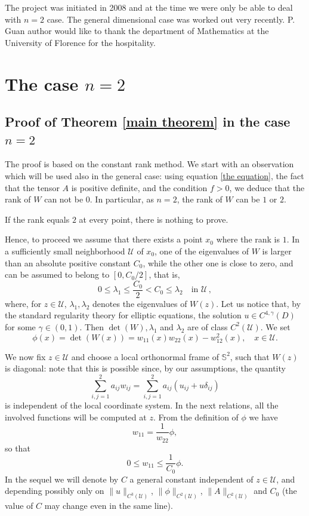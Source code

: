 \documentclass[12pt]{amsart}
\newcommand{\1}{\mathbf 1}
\newcommand{\s}{\mathbb S}
\begin{document}
The project was initiated in 2008 and at the time we were only be able to deal with $n=2$ case. The general dimensional case was worked out very recently. P. Guan author would like to thank the department of Mathematics at the University of Florence for the hospitality.

\section{The case $n=2$}\label{sec The case n=2}

\subsection{Proof of Theorem \ref{main theorem} in the case $n=2$}\label{section n=2} 

The proof is based on the constant rank method. 
We start with an observation which will be used also in the general case: using equation \eqref{the equation}, the fact that the tensor $A$ is positive definite, and the condition $f>0$, we deduce that the rank of $W$ can not be $0$. 
In particular, as $n=2$, the rank of $W$ can be $1$ or $2$. 

If the rank equals $2$ at every point, there is nothing to prove. 

Hence, to proceed we assume that there exists a point $x_0$ where the rank is $1$. In a sufficiently small neighborhood $\mathcal U$ of $x_0$, one of the eigenvalues of $W$ is larger than an absolute positive constant $C_0$, while the other one is close to zero, and can be assumed to belong to $[0,C_0/2]$, that is,
$$
0\leq\lambda_1\leq\frac{C_0}{2}<C_0\leq\lambda_2\quad\text{in }\mathcal U\,,
$$
where, for $z\in\mathcal U$, $\lambda_1,\lambda_2$ denotes the eigenvalues of $W(z)$.  Let us notice that, by the standard regularity theory for elliptic equations, the solution $u\in C^{4,\gamma}(D)$ for some $\gamma\in(0,1)$. Then $\det(W), \lambda_1$ and $\lambda_2$ are of class $C^{2}({\mathcal U})$. 
We set
\begin{equation}\label{test function two dim}
\phi(x)=\det(W(x))=w_{11}(x)w_{22}(x)-w_{12}^2(x),\quad x\in{\mathcal U}.
\end{equation}

We now fix $z\in{\mathcal U}$ and choose a local orthonormal frame of $\s^2$, such that $W(z)$ is diagonal: note that this is possible since, by our assumptions, the quantity
$$
\sum_{i,j=1}^2 a_{ij}w_{ij}=\sum_{i,j=1}^2 a_{ij}(u_{ij}+u\delta_{ij})
$$
is independent of the local coordinate system. In the next relations, all the involved functions will be computed at $z$. From the definition of $\phi$ we have
$$
w_{11}=\frac1{w_{22}}\phi,
$$
so that
\begin{equation}\label{p1}
0\leq w_{11}\le \frac{1}{C_0}\phi.
\end{equation}
In the sequel we will denote by $C$ a general constant independent of $z\in\mathcal U$, and depending possibly only on $\|u\|_{C^3({\mathcal U})}$, $\|\phi\|_{C^2({\mathcal U})}$, {$\|A\|_{C^2({\mathcal U})}$} and $C_0$ (the value of $C$ may change even in the same line). 
\end{document}
